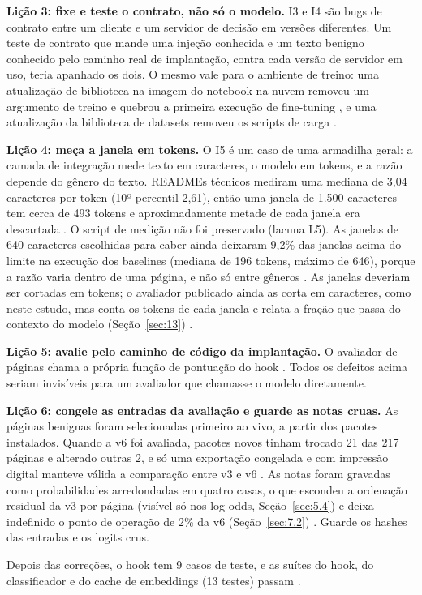 \documentclass[11pt]{article}
\begin{document}
\textbf{Lição 3: fixe e teste o contrato, não só o modelo.} I3 e I4 são bugs de contrato entre um cliente e um servidor de decisão em versões diferentes. Um teste de contrato que mande uma injeção conhecida e um texto benigno conhecido pelo caminho real de implantação, contra cada versão de servidor em uso, teria apanhado os dois. O mesmo vale para o ambiente de treino: uma atualização de biblioteca na imagem do notebook na nuvem removeu um argumento de treino e quebrou a primeira execução de fine-tuning%
, e uma atualização da biblioteca de datasets removeu os scripts de carga%
.

\textbf{Lição 4: meça a janela em tokens.} O I5 é um caso de uma armadilha geral: a camada de integração mede texto em caracteres, o modelo em tokens, e a razão depende do gênero do texto. READMEs técnicos mediram uma mediana de 3,04 caracteres por token (10º percentil 2,61), então uma janela de 1.500 caracteres tem cerca de 493 tokens e aproximadamente metade de cada janela era descartada%
. O script de medição não foi preservado (lacuna L5). As janelas de 640 caracteres escolhidas para caber ainda deixaram 9,2\% das janelas acima do limite na execução dos baselines (mediana de 196 tokens, máximo de 646), porque a razão varia dentro de uma página, e não só entre gêneros%
. As janelas deveriam ser cortadas em tokens; o avaliador publicado ainda as corta em caracteres, como neste estudo, mas conta os tokens de cada janela e relata a fração que passa do contexto do modelo (Seção~\ref{sec:13})%
.

\textbf{Lição 5: avalie pelo caminho de código da implantação.} O avaliador de páginas chama a própria função de pontuação do hook%
. Todos os defeitos acima seriam invisíveis para um avaliador que chamasse o modelo diretamente.

\textbf{Lição 6: congele as entradas da avaliação e guarde as notas cruas.} As páginas benignas foram selecionadas primeiro ao vivo, a partir dos pacotes instalados. Quando a v6 foi avaliada, pacotes novos tinham trocado 21 das 217 páginas e alterado outras 2, e só uma exportação congelada e com impressão digital manteve válida a comparação entre v3 e v6%
. As notas foram gravadas como probabilidades arredondadas em quatro casas, o que escondeu a ordenação residual da v3 por página (visível só nos log-odds, Seção~\ref{sec:5.4}) e deixa indefinido o ponto de operação de 2\% da v6 (Seção~\ref{sec:7.2})%
. Guarde os hashes das entradas e os logits crus.

Depois das correções, o hook tem 9 casos de teste, e as suítes do hook, do classificador e do cache de embeddings (13 testes) passam%
.
\end{document}
